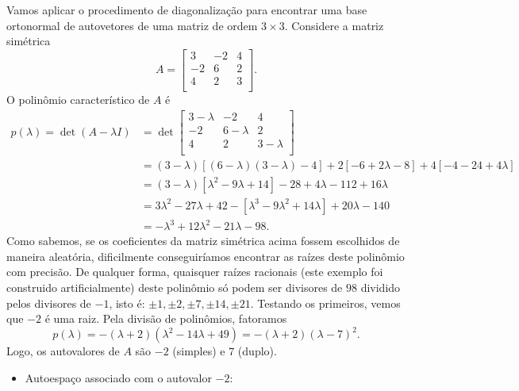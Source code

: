 \documentclass[../livro.tex]{subfiles}
\begin{document}
\begin{example}
	Vamos aplicar o procedimento de diagonalização para encontrar uma base ortonormal de autovetores de uma matriz de ordem $3 \times 3$. Considere a matriz simétrica
	\begin{equation}
	A = 
	\begin{bmatrix}
	3 & -2 & 4 \\  
	-2 & 6 & 2 \\
	4 & 2 & 3 \\
	\end{bmatrix}.
	\end{equation} O polinômio característico de $A$ é 
          \begin{align*}
	p(\lambda) = \det (A - \lambda I ) & = 
	\det 
	\begin{bmatrix}
	3- \lambda & -2 & 4 \\  
	-2 & 6- \lambda & 2 \\
	4 & 2 & 3- \lambda \\
	\end{bmatrix} \\
	& = (3-\lambda) \left[ (6 - \lambda)(3 - \lambda) - 4 \right] + 2 \left[ -6 + 2 \lambda - 8 \right]  + 4 \left[ - 4 - 24 + 4 \lambda \right]  \\
	& = (3-\lambda) \left[ \lambda^2 - 9 \lambda + 14 \right] -28 + 4 \lambda - 112 + 16 \lambda  \\
	& = 3\lambda^2 - 27 \lambda + 42  - \left[ \lambda^3 - 9 \lambda^2 + 14 \lambda \right] + 20 \lambda - 140  \\
	& = -\lambda^3 + 12 \lambda^2 - 21 \lambda - 98.
          \end{align*}
 Como sabemos, se os coeficientes da matriz simétrica acima fossem escolhidos de maneira aleatória, dificilmente conseguiríamos encontrar as raízes deste polinômio com precisão. De qualquer forma, quaisquer raízes racionais (este exemplo foi construido artificialmente) deste polinômio só podem ser divisores de $98$ dividido pelos divisores de $-1$, isto é: $\pm 1, \pm 2, \pm 7, \pm 14, \pm 21$. Testando os primeiros, vemos que $-2$ é uma raiz. Pela divisão de polinômios, fatoramos
	\begin{equation}
	p(\lambda) = -(\lambda + 2) (\lambda^2 - 14 \lambda + 49) = -(\lambda + 2)(\lambda - 7)^2.
	\end{equation} Logo, os autovalores de $A$ são $-2$ (simples) e $7$ (duplo).
	\begin{itemize}
		\item Autoespaço associado com o autovalor $-2$:

\end{itemize}
\end{example}
\end{document}
